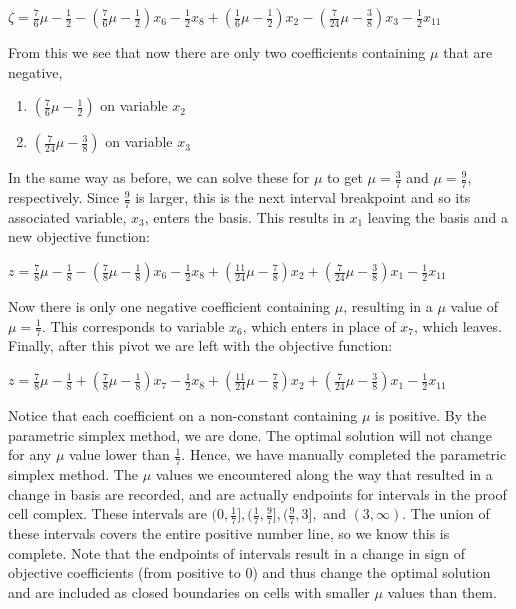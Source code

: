 \documentclass{article}
\begin{document}
\begin{center}
    $\zeta = \frac{7}{6}\mu - \frac{1}{2}-(\frac{7}{6}\mu -\frac{1}{2})x_6 - \frac{1}{2}x_8 + (\frac{1}{6}\mu - \frac{1}{2})x_2 - (\frac{7}{24}\mu -\frac{3}{8})x_3 - \frac{1}{2}x_{11}$
\end{center}

From this we see that now there are only two coefficients containing $\mu$ that are negative, 

\begin{enumerate}
    \item $(\frac{7}{6}\mu - \frac{1}{2})$ on variable $x_2$
    \item $(\frac{7}{24}\mu - \frac{3}{8})$ on variable $x_3$
\end{enumerate}

In the same way as before, we can solve these for $\mu$ to get $\mu = \frac{3}{7}$ and $\mu = \frac{9}{7}$, respectively. Since $\frac{9}{7}$ is larger, this is the next interval breakpoint and so its associated variable, $x_3$, enters the basis. This results in $x_1$ leaving the basis and a new objective function:

\begin{center}
    $z = \frac{7}{8}\mu - \frac{1}{8}-(\frac{7}{8}\mu -\frac{1}{8})x_6 - \frac{1}{2}x_8 + (\frac{11}{24}\mu - \frac{7}{8})x_2 + (\frac{7}{24}\mu -\frac{3}{8})x_1 - \frac{1}{2}x_{11}$
\end{center}

Now there is only one negative coefficient containing $\mu$, resulting in a $\mu$ value of $\mu = \frac{1}{7}$. This corresponds to variable $x_6$, which enters in place of $x_7$, which leaves. Finally, after this pivot we are left with the objective function:

\begin{center}
    $z = \frac{7}{8}\mu - \frac{1}{8}+(\frac{7}{8}\mu -\frac{1}{8})x_7 - \frac{1}{2}x_8 + (\frac{11}{24}\mu - \frac{7}{8})x_2 + (\frac{7}{24}\mu -\frac{3}{8})x_1 - \frac{1}{2}x_{11}$
\end{center}

Notice that each coefficient on a non-constant containing $\mu$ is positive. By the parametric simplex method, we are done. The optimal solution will not change for any $\mu$ value lower than $\frac{1}{7}$. Hence, we have manually completed the parametric simplex method. The $\mu$ values we encountered along the way that resulted in a change in basis are recorded, and are actually endpoints for intervals in the proof cell complex. These intervals are $(0, \frac{1}{7}], (\frac{1}{7}, \frac{9}{7}], (\frac{9}{7}, 3],$ and $(3, \infty)$. The union of these intervals covers the entire positive number line, so we know this is complete. Note that the endpoints of intervals result in a change in sign of objective coefficients (from positive to 0) and thus change the optimal solution and are included as closed boundaries on cells with smaller $\mu$ values than them.
\end{document}
